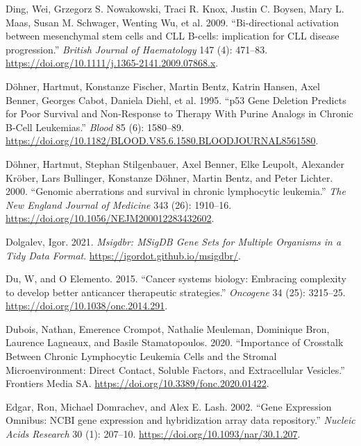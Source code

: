 \documentclass[11pt, a4paper, twosided]{book}
\newenvironment{CSLReferences}%
  {}%
  {\par}
\begin{document}
\begin{CSLReferences}{1}{0}
\leavevmode{}%
Ding, Wei, Grzegorz S. Nowakowski, Traci R. Knox, Justin C. Boysen, Mary L. Maas, Susan M. Schwager, Wenting Wu, et al. 2009. {``{Bi-directional activation between mesenchymal stem cells and CLL B-cells: implication for CLL disease progression}.''} \emph{British Journal of Haematology} 147 (4): 471--83. \url{https://doi.org/10.1111/j.1365-2141.2009.07868.x}.

\leavevmode{}%
Döhner, Hartmut, Konstanze Fischer, Martin Bentz, Katrin Hansen, Axel Benner, Georges Cabot, Daniela Diehl, et al. 1995. {``{p53 Gene Deletion Predicts for Poor Survival and Non-Response to Therapy With Purine Analogs in Chronic B-Cell Leukemias}.''} \emph{Blood} 85 (6): 1580--89. \url{https://doi.org/10.1182/BLOOD.V85.6.1580.BLOODJOURNAL8561580}.

\leavevmode{}%
Döhner, Hartmut, Stephan Stilgenbauer, Axel Benner, Elke Leupolt, Alexander Kröber, Lars Bullinger, Konstanze Döhner, Martin Bentz, and Peter Lichter. 2000. {``{Genomic aberrations and survival in chronic lymphocytic leukemia.}''} \emph{The New England Journal of Medicine} 343 (26): 1910--16. \url{https://doi.org/10.1056/NEJM200012283432602}.

\leavevmode{}%
Dolgalev, Igor. 2021. \emph{Msigdbr: MSigDB Gene Sets for Multiple Organisms in a Tidy Data Format}. \url{https://igordot.github.io/msigdbr/}.

\leavevmode{}%
Du, W, and O Elemento. 2015. {``{Cancer systems biology: Embracing complexity to develop better anticancer therapeutic strategies}.''} \emph{Oncogene} 34 (25): 3215--25. \url{https://doi.org/10.1038/onc.2014.291}.

\leavevmode{}%
Dubois, Nathan, Emerence Crompot, Nathalie Meuleman, Dominique Bron, Laurence Lagneaux, and Basile Stamatopoulos. 2020. {``{Importance of Crosstalk Between Chronic Lymphocytic Leukemia Cells and the Stromal Microenvironment: Direct Contact, Soluble Factors, and Extracellular Vesicles}.''} Frontiers Media SA. \url{https://doi.org/10.3389/fonc.2020.01422}.

\leavevmode{}%
Edgar, Ron, Michael Domrachev, and Alex E. Lash. 2002. {``{Gene Expression Omnibus: NCBI gene expression and hybridization array data repository}.''} \emph{Nucleic Acids Research} 30 (1): 207--10. \url{https://doi.org/10.1093/nar/30.1.207}.


\end{CSLReferences}
\end{document}
